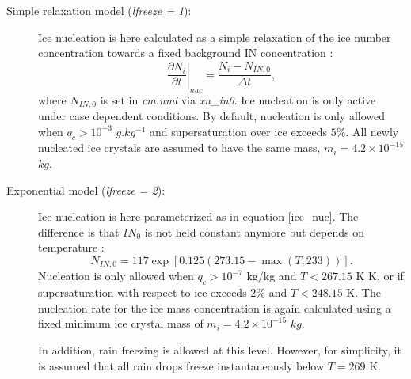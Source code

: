 \documentclass[12pt,A4,french]{article}
\begin{document}
\begin{description}

    \item[Simple relaxation model ({\it lfreeze = 1}):] Ice nucleation is here calculated as a simple relaxation of the ice number concentration towards a fixed background IN concentration \cite{Oal2014}:
\begin{equation}
\left.\frac{\partial N_{i}}{\partial t}\right|_{nuc} = \frac{N_{i} - N_{IN,0}}{\Delta t},
\label{ice_nuc}
\end{equation}
where $N_{IN,0}$ is set in {\it cm.nml} via {\it xn\_in0}. Ice nucleation is only active under case dependent conditions. By default, nucleation is only allowed when $q_c > 10^{-3}$ $g.kg^{-1}$ and supersaturation over ice exceeds $5\%$. All newly nucleated ice crystals are assumed to have the same mass, $m_i = 4.2\times 10^{-15}$ $kg$.

    \item[Exponential model ({\it lfreeze = 2}):] Ice nucleation is here parameterized as in equation \ref{ice_nuc}. The difference is that $IN_0$ is not held constant anymore but depends on temperature \cite{Dal2010}:
\begin{equation}
N_{IN,0} = 117\exp\left[0.125\left(273.15 - \max\left(T,233\right)\right)\right].
\end{equation}
Nucleation is only allowed when $q_c > 10^{-7}$ kg/kg and $T < 267.15$ K K, or if supersaturation with respect to ice exceeds $2\%$ and $T < 248.15$ K. The nucleation rate for the ice mass concentration is again calculated using a fixed minimum ice crystal mass of $m_i = 4.2\times 10^{-15}$ $kg$.

In addition, rain freezing is allowed at this level. However, for simplicity, it is assumed that all rain drops freeze instantaneously below $T = 269$ K.


\end{description}
\end{document}
